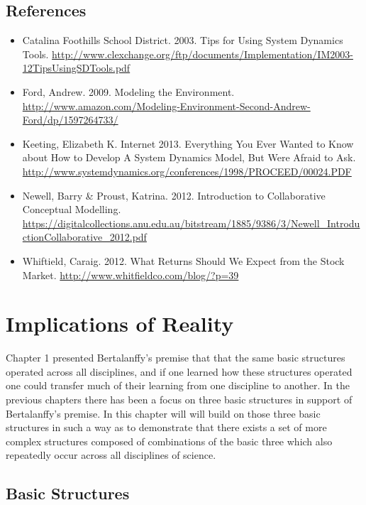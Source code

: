 \documentclass[]{memoir}
\begin{document}
\section{References}

\begin{itemize}
\itemsep1pt\parskip0pt
\item
  Catalina Foothills School District. 2003. Tips for Using System
  Dynamics Tools.
  \url{http://www.clexchange.org/ftp/documents/Implementation/IM2003-12TipsUsingSDTools.pdf}
\item
  Ford, Andrew. 2009. Modeling the Environment.
  \url{http://www.amazon.com/Modeling-Environment-Second-Andrew-Ford/dp/1597264733/}
\item
  Keeting, Elizabeth K. Internet 2013. Everything You Ever Wanted to
  Know about How to Develop A System Dynamics Model, But Were Afraid to
  Ask.
  \url{http://www.systemdynamics.org/conferences/1998/PROCEED/00024.PDF}
\item
  Newell, Barry \& Proust, Katrina. 2012. Introduction to Collaborative
  Conceptual Modelling.
  \url{https://digitalcollections.anu.edu.au/bitstream/1885/9386/3/Newell_IntroductionCollaborative_2012.pdf}
\item
  Whiftield, Caraig. 2012. What Returns Should We Expect from the Stock
  Market. \url{http://www.whitfieldco.com/blog/?p=39}
\end{itemize}

\chapter{Implications of Reality}

Chapter 1 presented Bertalanffy's premise that that the same basic
structures operated across all disciplines, and if one learned how these
structures operated one could transfer much of their learning from one
discipline to another. In the previous chapters there has been a focus
on three basic structures in support of Bertalanffy's premise. In this
chapter will will build on those three basic structures in such a way as
to demonstrate that there exists a set of more complex structures
composed of combinations of the basic three which also repeatedly occur
across all disciplines of science.

\section{Basic Structures}
\end{document}
